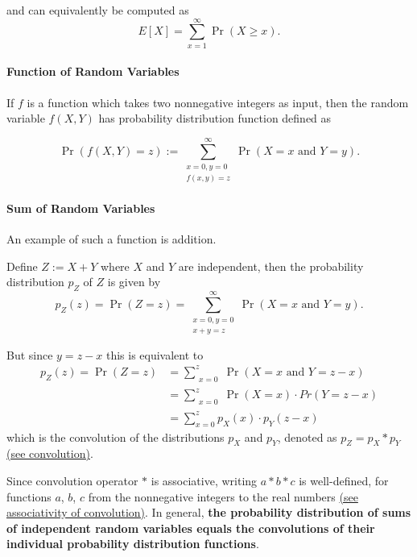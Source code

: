\documentclass{masterthesis}
\begin{document}
and can equivalently be computed as 
\begin{equation}
    E[X] = \sum_{x=1}^{\infty} \Pr(X \geq x).
\end{equation}

\paragraph*{Function of Random Variables}\label{paragraph:function_of_random_variables}
If $f$ is a function which takes two nonnegative integers as input, then the random variable $f(X, Y)$ has probability distribution function defined as

\begin{equation}
    \Pr(f(X, Y) = z) := \sum_{\substack{x=0, y=0 \\ f(x,y)=z}}^{\infty} \Pr(X = x \text{ and } Y = y).
\end{equation}

\paragraph*{Sum of Random Variables}\label{paragraph:sum_of_random_variables}
An example of such a function is addition. 

Define $Z := X+Y$ where $X$ and $Y$ are independent, then the probability distribution $p_Z$ of $Z$ is given by 
\begin{equation}
    p_Z(z) = \Pr(Z = z) = \sum_{\substack{x=0, y=0 \\ x+y=z}}^{\infty} \Pr(X = x \text{ and } Y = y).
\end{equation}

But since $y = z - x$ this is equivalent to
\begin{align}
    p_Z(z) = \Pr(Z = z) &= \sum_{\substack{x=0}}^{z} \Pr(X = x \text{ and } Y = z - x) \\ 
                        &= \sum_{\substack{x=0}}^{z} \Pr(X = x) \cdot Pr(Y = z - x) \\
                        &= \sum_{x=0}^{z} p_X(x) \cdot p_Y (z - x)
\end{align}
which is the convolution of the distributions $p_X$ and $p_Y$, denoted as $p_Z = p_X * p_Y$ \hyperref[eq:convolution]{(see convolution)}.

Since convolution operator $*$ is associative, writing $a * b * c$ is well-defined, for functions $a$, $b$, $c$ from the nonnegative integers to the real numbers \hyperref[page:convolution_associativity]{(see associativity of convolution)}.
In general, \textbf{the probability distribution of sums of independent random variables equals the convolutions of their individual probability distribution functions}.
\end{document}
